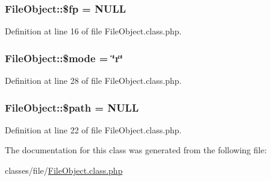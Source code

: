 \subsubsection[{\$fp}]{\setlength{\rightskip}{0pt plus 5cm}File\+Object\+::\$fp = N\+U\+L\+L}\label{classFileObject_a3b4c55272cc7ab0a4e7e79aec6ebfbac}


Definition at line 16 of file File\+Object.\+class.\+php.

\hypertarget{classFileObject_aa4cff8a1b117de6986c0765ae2284dab}{}
\subsubsection[{\$mode}]{\setlength{\rightskip}{0pt plus 5cm}File\+Object\+::\$mode = \char`\"{}r\char`\"{}}\label{classFileObject_aa4cff8a1b117de6986c0765ae2284dab}


Definition at line 28 of file File\+Object.\+class.\+php.

\hypertarget{classFileObject_aeaea5fd423f0c1349ad151f7da63f0e8}{}
\subsubsection[{\$path}]{\setlength{\rightskip}{0pt plus 5cm}File\+Object\+::\$path = N\+U\+L\+L}\label{classFileObject_aeaea5fd423f0c1349ad151f7da63f0e8}


Definition at line 22 of file File\+Object.\+class.\+php.



The documentation for this class was generated from the following file\+:\begin{DoxyCompactItemize}
\item 
classes/file/\hyperlink{FileObject_8class_8php}{File\+Object.\+class.\+php}\end{DoxyCompactItemize}
